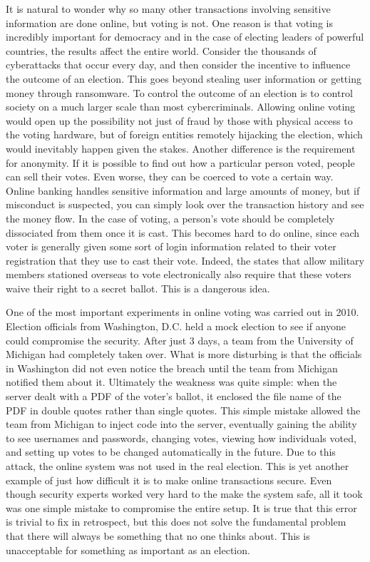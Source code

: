 \documentclass[12pt, titlepage]{article}
\begin{document}
It is natural to wonder why so many other transactions involving sensitive information are done online, but voting is not. One reason is that voting is incredibly important for democracy and in the case of electing leaders of powerful countries, the results affect the entire world. Consider the thousands of cyberattacks that occur every day, and then consider the incentive to influence the outcome of an election. This goes beyond stealing user information or getting money through ransomware. To control the outcome of an election is to control society on a much larger scale than most cybercriminals. Allowing online voting would open up the possibility not just of fraud by those with physical access to the voting hardware, but of foreign entities remotely hijacking the election, which would inevitably happen given the stakes. Another difference is the requirement for anonymity. If it is possible to find out how a particular person voted, people can sell their votes. Even worse, they can be coerced to vote a certain way. Online banking handles sensitive information and large amounts of money, but if misconduct is suspected, you can simply look over the transaction history and see the money flow. In the case of voting, a person's vote should be completely dissociated from them once it is cast. This becomes hard to do online, since each voter is generally given some sort of login information related to their voter registration that they use to cast their vote. Indeed, the states that allow military members stationed overseas to vote electronically also require that these voters waive their right to a secret ballot. \cite{waivesecret} This is a dangerous idea.

One of the most important experiments in online voting was carried out in 2010. Election officials from Washington, D.C. held a mock election to see if anyone could compromise the security. After just 3 days, a team from the University of Michigan had completely taken over. What is more disturbing is that the officials in Washington did not even notice the breach until the team from Michigan notified them about it. \cite{hao2016real} Ultimately the weakness was quite simple: when the server dealt with a PDF of the voter's ballot, it enclosed the file name of the PDF in double quotes rather than single quotes. This simple mistake allowed the team from Michigan to inject code into the server, eventually gaining the ability to see usernames and passwords, changing votes, viewing how individuals voted, and setting up votes to be changed automatically in the future. Due to this attack, the online system was not used in the real election. This is yet another example of just how difficult it is to make online transactions secure. Even though security experts worked very hard to the make the system safe, all it took was one simple mistake to compromise the entire setup. It is true that this error is trivial to fix in retrospect, but this does not solve the fundamental problem that there will always be something that no one thinks about. This is unacceptable for something as important as an election.
\end{document}
